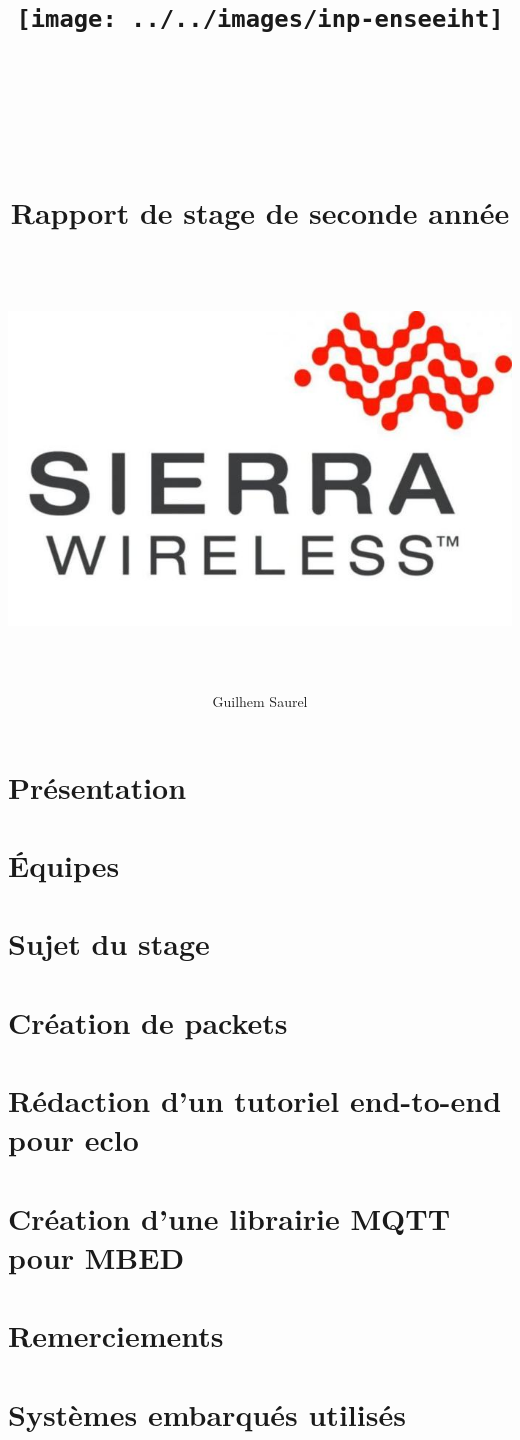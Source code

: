 \documentclass{article}
\title{\texttt{[image: ../../images/inp-enseeiht]} \\ ~ \\ ~ \\ ~ \\ ~ \\ Rapport de stage de seconde année \\ ~ \\ ~ \\ \includegraphics[width=\linewidth]{img/swir.jpg} \\ ~ \\}
\author{Guilhem Saurel}
\date{\oldstylenums{\today}}
\begin{document}
\begin{titlepage}
    \setcounter{page}{0}
    \maketitle
    \thispagestyle{empty}
\end{titlepage}

\tableofcontents
\setcounter{page}{0}
\thispagestyle{empty}

\clearpage

\section{Présentation}

\clearpage

\section{Équipes}

\clearpage

\section{Sujet du stage}

\clearpage

\section{Création de packets}

\clearpage

\section{Rédaction d’un tutoriel end-to-end pour eclo}

\clearpage

\section{Création d’une librairie MQTT pour MBED}

\clearpage

\section{Remerciements}

\clearpage

\appendix
\section{Systèmes embarqués utilisés}
\end{document}
